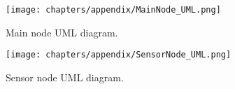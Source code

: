 \addtolength{\topmargin}{-.875in}
\begin{figure}[h!]
\centering
\texttt{[image: chapters/appendix/MainNode\_UML.png]}
\caption{Main node UML diagram.}
\label{fig:mainuml}
\end{figure}
\clearpage
\begin{figure}[h!]
\centering
\texttt{[image: chapters/appendix/SensorNode\_UML.png]}
\caption{Sensor node UML diagram.}
\label{fig:sensoruml}
\end{figure}